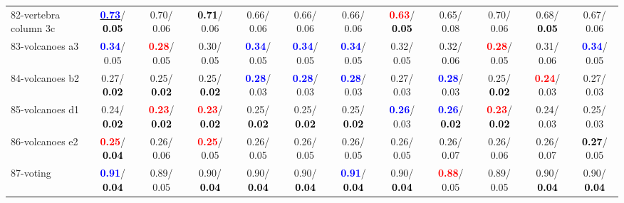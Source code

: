 \begin{table}[h]
\begin{center}
{\begin{tabular}{lc|c|c|c|c|c|c|c|c|c|c}
82-vertebra column 3c & \underline{\textcolor{blue}{\textbf{  0.73}}}/\textcolor{black}{\textbf{  0.05}} &   0.70/  0.06 & \textcolor{black}{\textbf{  0.71}}/  0.06 &   0.66/  0.06 &   0.66/  0.06 &   0.66/  0.06 & \textcolor{red}{\textbf{  0.63}}/\textcolor{black}{\textbf{  0.05}} &   0.65/  0.08 &   0.70/  0.06 &   0.68/\textcolor{black}{\textbf{  0.05}} &   0.67/  0.06 \\
83-volcanoes a3 & \textcolor{blue}{\textbf{  0.34}}/  0.05 & \textcolor{red}{\textbf{  0.28}}/  0.05 &   0.30/  0.05 & \textcolor{blue}{\textbf{  0.34}}/  0.05 & \textcolor{blue}{\textbf{  0.34}}/  0.05 & \textcolor{blue}{\textbf{  0.34}}/  0.05 &   0.32/  0.05 &   0.32/  0.06 & \textcolor{red}{\textbf{  0.28}}/  0.05 &   0.31/  0.06 & \textcolor{blue}{\textbf{  0.34}}/  0.05 \\
84-volcanoes b2 &   0.27/\textcolor{black}{\textbf{  0.02}} &   0.25/\textcolor{black}{\textbf{  0.02}} &   0.25/\textcolor{black}{\textbf{  0.02}} & \textcolor{blue}{\textbf{  0.28}}/  0.03 & \textcolor{blue}{\textbf{  0.28}}/  0.03 & \textcolor{blue}{\textbf{  0.28}}/  0.03 &   0.27/  0.03 & \textcolor{blue}{\textbf{  0.28}}/  0.03 &   0.25/\textcolor{black}{\textbf{  0.02}} & \textcolor{red}{\textbf{  0.24}}/  0.03 &   0.27/  0.03 \\
85-volcanoes d1 &   0.24/\textcolor{black}{\textbf{  0.02}} & \textcolor{red}{\textbf{  0.23}}/\textcolor{black}{\textbf{  0.02}} & \textcolor{red}{\textbf{  0.23}}/\textcolor{black}{\textbf{  0.02}} &   0.25/\textcolor{black}{\textbf{  0.02}} &   0.25/\textcolor{black}{\textbf{  0.02}} &   0.25/\textcolor{black}{\textbf{  0.02}} & \textcolor{blue}{\textbf{  0.26}}/  0.03 & \textcolor{blue}{\textbf{  0.26}}/\textcolor{black}{\textbf{  0.02}} & \textcolor{red}{\textbf{  0.23}}/\textcolor{black}{\textbf{  0.02}} &   0.24/  0.03 &   0.25/  0.03 \\ \hline
86-volcanoes e2 & \textcolor{red}{\textbf{  0.25}}/\textcolor{black}{\textbf{  0.04}} &   0.26/  0.06 & \textcolor{red}{\textbf{  0.25}}/  0.05 &   0.26/  0.05 &   0.26/  0.05 &   0.26/  0.05 &   0.26/  0.05 &   0.26/  0.07 &   0.26/  0.06 &   0.26/  0.07 & \textcolor{black}{\textbf{  0.27}}/  0.05 \\
87-voting & \textcolor{blue}{\textbf{  0.91}}/\textcolor{black}{\textbf{  0.04}} &   0.89/  0.05 &   0.90/\textcolor{black}{\textbf{  0.04}} &   0.90/\textcolor{black}{\textbf{  0.04}} &   0.90/\textcolor{black}{\textbf{  0.04}} & \textcolor{blue}{\textbf{  0.91}}/\textcolor{black}{\textbf{  0.04}} &   0.90/\textcolor{black}{\textbf{  0.04}} & \textcolor{red}{\textbf{  0.88}}/  0.05 &   0.89/  0.05 &   0.90/\textcolor{black}{\textbf{  0.04}} &   0.90/\textcolor{black}{\textbf{  0.04}} \\

\end{tabular}}
\end{center}
\end{table}

